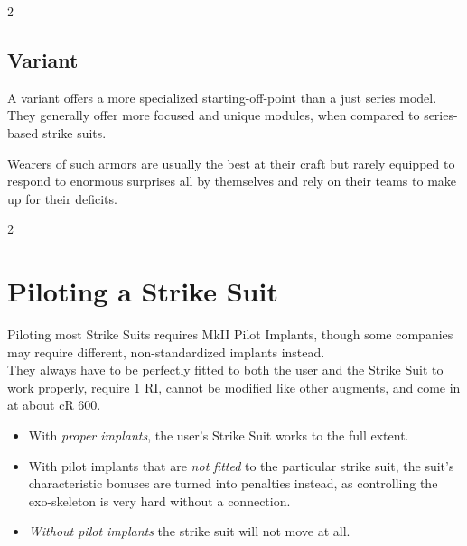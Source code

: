 \documentclass[12pt,a4paper,openany,usenames,dvipsnames]{book}
\begin{document}
    \begin{multicols}{2}
    	\raggedcolumns
    \end{multicols}
    
    \pagebreak
    \section{Variant}
    A variant offers a more specialized starting-off-point than a just series model.
    They generally offer more focused and unique modules, when compared to series-based strike suits.
    \par
    Wearers of such armors are usually the best at their craft but rarely equipped to respond to enormous surprises all by themselves and rely on their teams to make up for their deficits.
    \par
    
    \begin{multicols}{2}
    	\raggedcolumns
    \end{multicols}
    
    \chapter{Piloting a Strike Suit}
    Piloting most Strike Suits requires MkII Pilot Implants, though some companies may require different, non-standardized implants instead.\\
    They always have to be perfectly fitted to both the user and the Strike Suit to work properly, require 1 RI, cannot be modified like other augments, and come in at about cR 600.\\
    \begin{itemize}
    	\item With \emph{proper implants}, the user's Strike Suit works to the full extent.
    	\item With pilot implants that are \emph{not fitted} to the particular strike suit, the suit's characteristic bonuses are turned into penalties instead, as controlling the exo-skeleton is very hard without a connection.
    	\item \emph{Without pilot implants} the strike suit will not move at all.
    \end{itemize}
    
\end{document}
